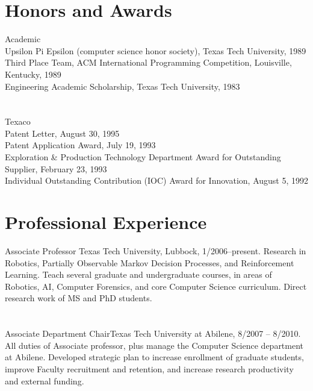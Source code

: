 \documentclass[10pt]{resume}
\begin{document}
\section{Honors and Awards}  
{Academic}   
{\\
Upsilon Pi Epsilon (computer science honor society), Texas Tech University,
1989\\
Third Place Team, ACM International Programming Competition,
Louisville, Kentucky,  1989\\
Engineering Academic Scholarship, Texas Tech University, 1983}

\section{}
{Texaco}   
{\\Patent Letter, August 30, 1995\\
Patent Application Award, July 19, 1993 \\
Exploration \& Production Technology Department Award for 
Outstanding Supplier, February 23, 1993  \\
Individual Outstanding Contribution (IOC) Award for Innovation,
August 5, 1992}


\section{Professional Experience}
{Associate Professor} {Texas Tech University, Lubbock, 1/2006--present.
Research in Robotics, Partially Observable Markov Decision Processes, and
Reinforcement Learning.  Teach several graduate and undergraduate courses,
in areas of Robotics, AI, Computer Forensics, and core Computer Science
curriculum.  Direct research work of MS and PhD
students.}

\section{}
{Associate Department Chair}{Texas Tech University at Abilene, 8/2007 --
8/2010.  All duties of Associate professor, plus manage the Computer
Science department at Abilene.
Developed strategic plan to increase enrollment of graduate students,
improve Faculty recruitment and retention, and increase research productivity
and external funding.}
\end{document}
